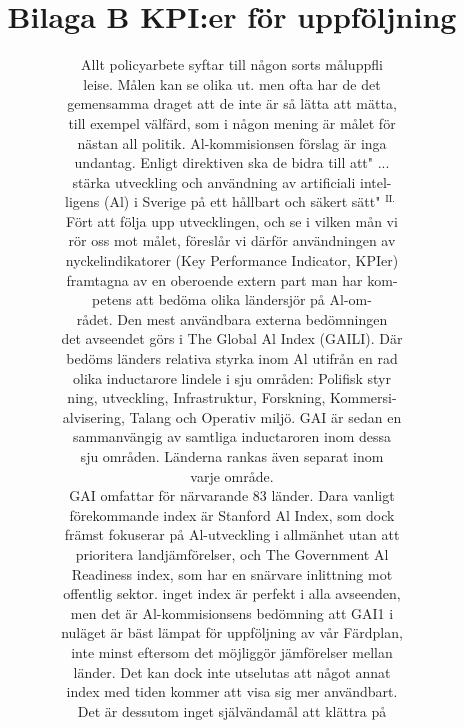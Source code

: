 \title{
Bilaga B KPI:er för uppföljning
}
\author{
Allt policyarbete syftar till någon sorts måluppfli \\ leise. Målen kan se olika ut. men ofta har de det \\ gemensamma draget att de inte är så lätta att mätta, \\ till exempel välfärd, som i någon mening är målet för \\ nästan all politik. Al-kommisionsen förslag är inga \\ undantag. Enligt direktiven ska de bidra till att" ... \\ stärka utveckling och användning av artificiali intel- \\ ligens (Al) i Sverige på ett hållbart och säkert sätt" \({ }^{\text {II. }}\) \\ Fört att följa upp utvecklingen, och se i vilken mån vi \\ rör oss mot målet, föreslår vi därför användningen av \\ nyckelindikatorer (Key Performance Indicator, KPIer) \\ framtagna av en oberoende extern part man har kom- \\ petens att bedöma olika ländersjör på Al-om- \\ rådet. Den mest användbara externa bedömningen \\ det avseendet görs i The Global Al Index (GAILI). Där \\ bedöms länders relativa styrka inom Al utifrån en rad \\ olika inductarore lindele i sju områden: Polifisk styr \\ ning, utveckling, Infrastruktur, Forskning, Kommersi- \\ alvisering, Talang och Operativ miljö. GAI är sedan en \\ sammanvängig av samtliga inductaroren inom dessa \\ sju områden. Länderna rankas även separat inom \\ varje område. \\ GAI omfattar för närvarande 83 länder. Dara vanligt \\ förekommande index är Stanford Al Index, som dock \\ främst fokuserar på Al-utveckling i allmänhet utan att \\ prioritera landjämförelser, och The Government Al \\ Readiness index, som har en snärvare inlittning mot \\ offentlig sektor. inget index är perfekt i alla avseenden, \\ men det är Al-kommisionsens bedömning att GAI1 i \\ nuläget är bäst lämpat för uppföljning av vår Färdplan, \\ inte minst eftersom det möjliggör jämförelser mellan \\ länder. Det kan dock inte utselutas att något annat \\ index med tiden kommer att visa sig mer användbart. \\ Det är dessutom inget självändamål att klättra på \\ }
